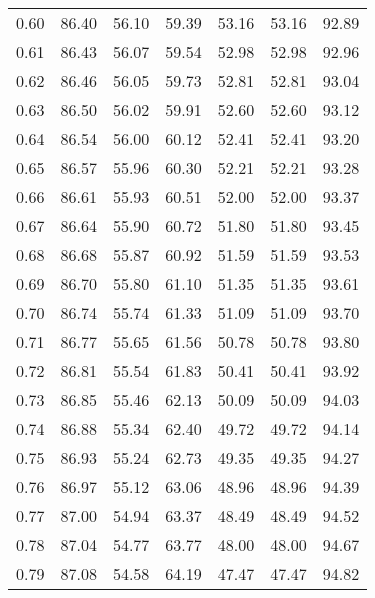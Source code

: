 \begin{tabular}{|c|c|c|c|c|c|c|}
      0.60 &     86.40 &     56.10 &      59.39 &   53.16 &      53.16 &         92.89 \\
      0.61 &     86.43 &     56.07 &      59.54 &   52.98 &      52.98 &         92.96 \\
      0.62 &     86.46 &     56.05 &      59.73 &   52.81 &      52.81 &         93.04 \\
      0.63 &     86.50 &     56.02 &      59.91 &   52.60 &      52.60 &         93.12 \\
      0.64 &     86.54 &     56.00 &      60.12 &   52.41 &      52.41 &         93.20 \\
      0.65 &     86.57 &     55.96 &      60.30 &   52.21 &      52.21 &         93.28 \\
      0.66 &     86.61 &     55.93 &      60.51 &   52.00 &      52.00 &         93.37 \\
      0.67 &     86.64 &     55.90 &      60.72 &   51.80 &      51.80 &         93.45 \\
      0.68 &     86.68 &     55.87 &      60.92 &   51.59 &      51.59 &         93.53 \\
      0.69 &     86.70 &     55.80 &      61.10 &   51.35 &      51.35 &         93.61 \\
      0.70 &     86.74 &     55.74 &      61.33 &   51.09 &      51.09 &         93.70 \\
      0.71 &     86.77 &     55.65 &      61.56 &   50.78 &      50.78 &         93.80 \\
      0.72 &     86.81 &     55.54 &      61.83 &   50.41 &      50.41 &         93.92 \\
      0.73 &     86.85 &     55.46 &      62.13 &   50.09 &      50.09 &         94.03 \\
      0.74 &     86.88 &     55.34 &      62.40 &   49.72 &      49.72 &         94.14 \\
      0.75 &     86.93 &     55.24 &      62.73 &   49.35 &      49.35 &         94.27 \\
      0.76 &     86.97 &     55.12 &      63.06 &   48.96 &      48.96 &         94.39 \\
      0.77 &     87.00 &     54.94 &      63.37 &   48.49 &      48.49 &         94.52 \\
      0.78 &     87.04 &     54.77 &      63.77 &   48.00 &      48.00 &         94.67 \\
      0.79 &     87.08 &     54.58 &      64.19 &   47.47 &      47.47 &         94.82 \\

\end{tabular}
